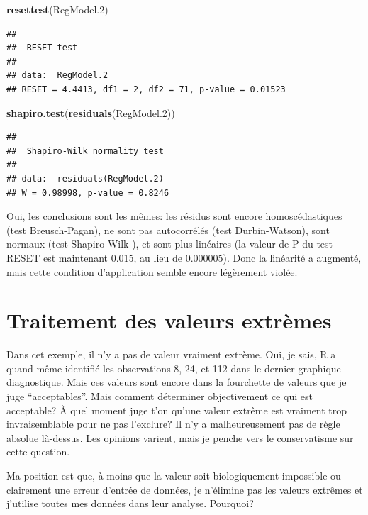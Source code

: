 \documentclass[12pt,]{book}
\newenvironment{Shaded}{\begin{snugshade}}{\end{snugshade}}
\newcommand{\FloatTok}[1]{\textcolor[rgb]{0.06,0.06,0.06}{#1}}
\newcommand{\KeywordTok}[1]{\textcolor[rgb]{0.27,0.27,0.27}{\textbf{#1}}}
\newcommand{\NormalTok}[1]{#1}
\begin{document}
\begin{Shaded}
\begin{Highlighting}[]
\KeywordTok{resettest}\NormalTok{(RegModel}\FloatTok{.2}\NormalTok{)}
\end{Highlighting}
\end{Shaded}

\begin{verbatim}
## 
## 	RESET test
## 
## data:  RegModel.2
## RESET = 4.4413, df1 = 2, df2 = 71, p-value = 0.01523
\end{verbatim}

\begin{Shaded}
\begin{Highlighting}[]
\KeywordTok{shapiro.test}\NormalTok{(}\KeywordTok{residuals}\NormalTok{(RegModel}\FloatTok{.2}\NormalTok{))}
\end{Highlighting}
\end{Shaded}

\begin{verbatim}
## 
## 	Shapiro-Wilk normality test
## 
## data:  residuals(RegModel.2)
## W = 0.98998, p-value = 0.8246
\end{verbatim}

Oui, les conclusions sont les mêmes: les résidus sont encore homoscédastiques (test Breusch-Pagan), ne sont pas autocorrélés (test Durbin-Watson), sont normaux (test Shapiro-Wilk ), et sont plus linéaires (la valeur de P du test RESET est maintenant 0.015, au lieu de 0.000005). Donc la linéarité a augmenté, mais cette condition d'application semble encore légèrement violée.

\hypertarget{traitement-des-valeurs-extruxe8mes}{%
\section{Traitement des valeurs extrèmes}\label{traitement-des-valeurs-extruxe8mes}}

Dans cet exemple, il n'y a pas de valeur vraiment extrème. Oui, je sais, R a quand même identifié les observations 8, 24, et 112 dans le dernier graphique diagnostique. Mais ces valeurs sont encore dans la fourchette de valeurs que je juge ``acceptables''. Mais comment déterminer objectivement ce qui est acceptable? À quel moment juge t'on qu'une valeur extrême est vraiment trop invraisemblable pour ne pas l'exclure? Il n'y a malheureusement pas de règle absolue là-dessus. Les opinions varient, mais je penche vers le conservatisme sur cette question.

Ma position est que, à moins que la valeur soit biologiquement impossible ou clairement une erreur d'entrée de données, je n'élimine pas les valeurs extrêmes et j'utilise toutes mes données dans leur analyse. Pourquoi?
\end{document}
